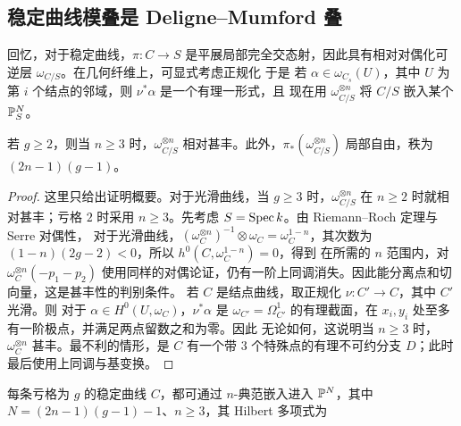 \subsection{稳定曲线模叠是 Deligne–Mumford 叠}
回忆，对于稳定曲线，$\pi:C\to S$ 是平展局部完全交态射，因此具有相对对偶化可逆层 $\omega_{C/S}$。在几何纤维上，可显式考虑正规化
于是
若 $\alpha\in\omega_{C_s}(U)$，其中 $U$ 为第 $i$ 个结点的邻域，则 $\nu^*\alpha$ 是一个有理一形式，且
现在用 $\omega_{C/S}^{\otimes n}$ 将 $C/S$ 嵌入某个 $\mathbb P_S^N$。
\begin{theorem}\label{thm:2.8}
若 $g\ge2$，则当 $n\ge3$ 时，$\omega_{C/S}^{\otimes n}$ 相对甚丰。此外，$\pi_*(\omega_{C/S}^{\otimes n})$ 局部自由，秩为 $(2n-1)(g-1)$。
\end{theorem}
\begin{proof}
这里只给出证明概要。对于光滑曲线，当 $g\ge3$ 时，$\omega_{C/S}^{\otimes n}$ 在 $n\ge2$ 时就相对甚丰；亏格 $2$ 时采用 $n\ge3$。先考虑 $S=\operatorname{Spec} k$。由 Riemann–Roch 定理与 Serre 对偶性，
对于光滑曲线，$(\omega_C^{\otimes n})^{-1}\otimes\omega_C=\omega_C^{1-n}$，其次数为 $(1-n)(2g-2)<0$，所以 $h^0(C,\omega_C^{1-n})=0$，得到
在所需的 $n$ 范围内，对 $\omega_C^{\otimes n}(-p_1-p_2)$ 使用同样的对偶论证，仍有一阶上同调消失。因此能分离点和切向量，这是甚丰性的判别条件。
若 $C$ 是结点曲线，取正规化 $\nu:C'\to C$，其中 $C'$ 光滑。则
对于 $\alpha\in H^0(U,\omega_C)$，$\nu^*\alpha$ 是 $\omega_{C'}=\Omega_{C'}^1$ 的有理截面，在 $x_i,y_i$ 处至多有一阶极点，并满足两点留数之和为零。因此
无论如何，这说明当 $n\ge3$ 时，$\omega_C^{\otimes n}$ 甚丰。最不利的情形，是 $C$ 有一个带 $3$ 个特殊点的有理不可约分支 $D$；此时
最后使用上同调与基变换。
\end{proof}
\begin{corollary}\label{cor:2.9}
每条亏格为 $g$ 的稳定曲线 $C$，都可通过 $n$-典范嵌入进入 $\mathbb P^N$，其中 $N=(2n-1)(g-1)-1$、$n\ge3$，其 Hilbert 多项式为
\end{corollary}
